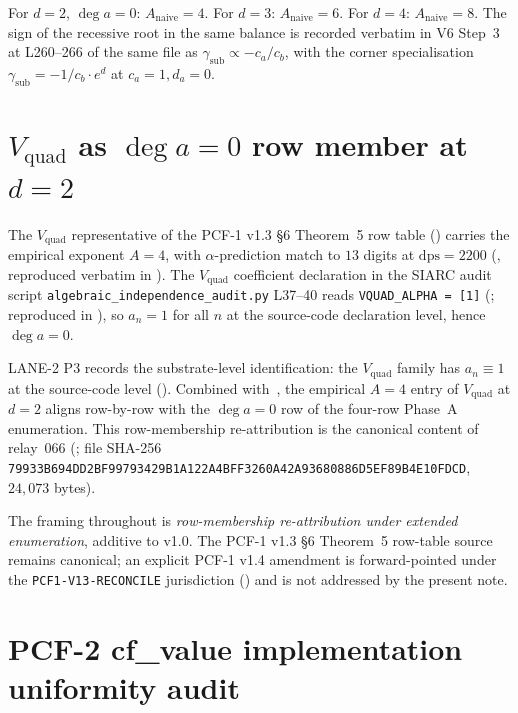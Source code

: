 \documentclass[11pt,reqno]{amsart}
\theoremstyle{plain}
\theoremstyle{definition}
\theoremstyle{remark}
\newcommand{\dps}{\mathrm{dps}}
\newcommand{\Anaive}{A_{\mathrm{naive}}}
\newcommand{\dega}{\deg a}
\newcommand{\Vquad}{V_{\mathrm{quad}}}
\begin{document}
\noindent
For $d = 2$, $\dega = 0$: $\Anaive = 4$. For $d = 3$:
$\Anaive = 6$. For $d = 4$: $\Anaive = 8$. The sign of the
recessive root in the same balance is recorded verbatim in V6
Step~3 at L260--266 of the same file as
$\gamma_{\mathrm{sub}} \propto -c_a / c_b$, with the corner
specialisation $\gamma_{\mathrm{sub}} = -1/c_b \cdot e^{d}$ at
$c_a = 1, d_a = 0$.

\section{$\Vquad$ as $\dega = 0$ row member at $d = 2$}
\label{sec:vquad-row}

The $\Vquad$ representative of the PCF-1 v1.3 \S 6 Theorem~5
row table (\cite{papanokechi_pcf1_v13}) carries the empirical
exponent $A = 4$, with $\alpha$-prediction match to
$13$ digits at $\dps = 2200$
(\cite[L566--577]{papanokechi_pcf1_v13}, reproduced verbatim
in \cite[\S 2.2]{pcf1_v13_v_quad_row_reframing_066}). The
$\Vquad$ coefficient declaration in the SIARC audit script
\texttt{algebraic\_independence\_audit.py} L37--40 reads
\verb|VQUAD_ALPHA = [1]| (\cite[V5, L161--179]%
{lane2_independent_substrate_verification}; reproduced in
\cite[\S 3]{pcf1_v13_v_quad_row_reframing_066}), so $a_n = 1$
for all $n$ at the source-code declaration level, hence
$\dega = 0$.

LANE-2 P3 records the substrate-level identification: the
$\Vquad$ family has $a_n \equiv 1$ at the source-code level
(\cite[L77--96]{lane2_independent_depth_probe}). Combined
with~, the empirical $A = 4$ entry of
$\Vquad$ at $d = 2$ aligns row-by-row with the $\dega = 0$
row of the four-row Phase~A enumeration. This row-membership
re-attribution is the canonical content of relay~066
(\cite[\S 5]{pcf1_v13_v_quad_row_reframing_066}; file SHA-256
\verb|79933B694DD2BF99793429B1A122A4BFF3260A42A93680886D5EF89B4E10FDCD|,
$24{,}073$ bytes).

The framing throughout is \emph{row-membership re-attribution
under extended enumeration}, additive to v1.0. The PCF-1 v1.3
\S 6 Theorem~5 row-table source remains canonical; an explicit
PCF-1 v1.4 amendment is forward-pointed under the
\texttt{PCF1-V13-RECONCILE} jurisdiction
(\cite[\S 1, \S 6]{pcf1_v13_v_quad_row_reframing_066}) and is
not addressed by the present note.

\section{PCF-2 cf\_value implementation uniformity audit}
\label{sec:pcf2-uniformity}
\end{document}
